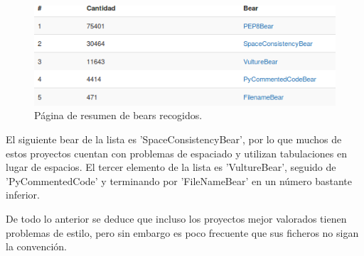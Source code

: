 \documentclass[a4paper, 12pt]{book}
\begin{document}
\begin{figure}[h]
  \centering
  \includegraphics[width=15cm, keepaspectratio]{img/resultadosBear}
  \caption{Página de resumen de bears recogidos.}
  \label{fig:resultadosBear}
\end{figure}

El siguiente bear de la lista es 'SpaceConsistencyBear', por lo que muchos de estos proyectos cuentan con problemas de espaciado y utilizan tabulaciones en lugar de espacios. El tercer elemento de la lista es 'VultureBear', seguido de 'PyCommentedCode' y terminando por 'FileNameBear' en un número bastante inferior.

De todo lo anterior se deduce que incluso los proyectos mejor valorados tienen problemas de estilo, pero sin embargo es poco frecuente que sus ficheros no sigan la convención.
\end{document}
